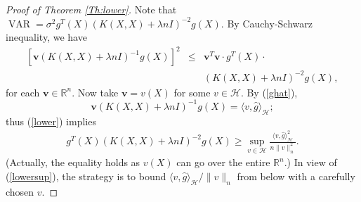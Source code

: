 \documentclass[12pt]{article}
\theoremstyle{plain}
\theoremstyle{remark}
\begin{document}
\begin{proof}[Proof of Theorem \ref{Th:lower}]
    Note that $\operatorname{VAR}=\sigma^2g^T(X)(K(X,X)+\lambda n I)^{-2}g(X)$.
    By Cauchy-Schwarz inequality, we have
    \begin{eqnarray}\label{lower}
        [\mathbf{v}(K(X,X)+\lambda n I)^{-1}g(X)]^2&\leq &\mathbf{v}^T\mathbf{v}\cdot g^T(X)\cdot\nonumber\\
        &&(K(X,X)+\lambda n I)^{-2}g(X),
    \end{eqnarray}
    for each $\mathbf{v}\in\mathbb{R}^n$. Now take $\mathbf{v}=v(X)$ for some $v\in\mathcal{H}$. By (\ref{ghat}), 
    \[\mathbf{v}(K(X,X)+\lambda n I)^{-1}g(X)=\langle v,\hat{g}\rangle_\mathcal{H};\]
    thus (\ref{lower}) implies
    \begin{eqnarray}\label{lowersup}
        g^T(X)(K(X,X)+\lambda n I)^{-2}g(X)\geq \sup_{v\in\mathcal{H}}\frac{\langle v,\hat{g}\rangle^2_\mathcal{H}}{n\|v\|^2_n}.
    \end{eqnarray}
    (Actually, the equality holds as $v(X)$ can go over the entire $\mathbb{R}^n$.) In view of (\ref{lowersup}), the strategy is to bound $\langle v,\hat{g}\rangle_\mathcal{H}/\|v\|_n$ from below with a carefully chosen $v$.


    

\end{proof}
\end{document}
